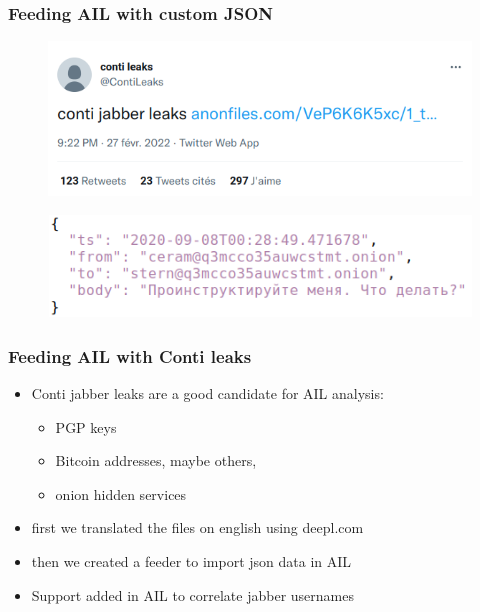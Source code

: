 \documentclass[10pt,aspectratio=169, colorlinks=true, linkcolor=circlBlue]{beamer}
\begin{document}

\begin{frame}[fragile]
	\frametitle{Feeding AIL with custom JSON}
	\begin{figure}[t]
		\includegraphics[width=.8\textwidth]{screenshot/contileaks-twitter.png}
		\centering
	\end{figure}

	\begin{figure}[t]
		\includegraphics[width=.6\textwidth]{screenshot/contileaks-json.png}
		\centering
	\end{figure}

\end{frame}

\begin{frame}[fragile]                                                                                                                        

   \frametitle{Feeding AIL with Conti leaks}

        \begin{itemize}
		\item Conti jabber leaks are a good candidate for AIL analysis:
        	\begin{itemize}
			\item PGP keys
			\item Bitcoin addresses, maybe others,
			\item onion hidden services
        	\end{itemize}
        \item first we translated the files on english using deepl.com
		\item then we created a feeder to import json data in AIL
		\item Support added in AIL to correlate jabber usernames
        \end{itemize}

\end{frame}
\end{document}
